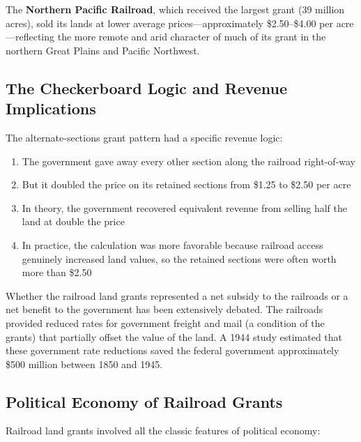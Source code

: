 \documentclass[12pt]{article}
\begin{document}
The \textbf{Northern Pacific Railroad}, which received the largest grant (39 million acres), sold its lands at lower average prices---approximately \$2.50--\$4.00 per acre---reflecting the more remote and arid character of much of its grant in the northern Great Plains and Pacific Northwest.

\subsection{The Checkerboard Logic and Revenue Implications}

The alternate-sections grant pattern had a specific revenue logic:

\begin{enumerate}
\item The government gave away every other section along the railroad right-of-way
\item But it doubled the price on its retained sections from \$1.25 to \$2.50 per acre
\item In theory, the government recovered equivalent revenue from selling half the land at double the price
\item In practice, the calculation was more favorable because railroad access genuinely increased land values, so the retained sections were often worth more than \$2.50
\end{enumerate}

Whether the railroad land grants represented a net subsidy to the railroads or a net benefit to the government has been extensively debated.  The railroads provided reduced rates for government freight and mail (a condition of the grants) that partially offset the value of the land.  A 1944 study estimated that these government rate reductions saved the federal government approximately \$500 million between 1850 and 1945.

\subsection{Political Economy of Railroad Grants}

Railroad land grants involved all the classic features of political economy:
\end{document}
